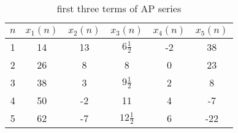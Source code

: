 

\begin{table}[h]
  \centering
  \begin{tabular}{|c|c|c|c|c|c| }
    \hline
    \(n\) & \(x_1(n)\)& \(x_2(n)\) & \(x_3(n)\) & \(x_4(n)\) & \(x_5(n)\) \\
    \hline
    1 & 14 & 13 & $6\frac{1}{2}$ & -2 & 38 \\
    2 & 26 & 8 & 8 & 0 & 23 \\
    3 & 38 & 3 & $9\frac{1}{2}$ & 2 & 8 \\
    4 & 50 & -2 & 11 & 4 & -7 \\
    5 & 62 & -7 & $12\frac{1}{2}$ & 6 & -22 \\
    \hline
  \end{tabular}
  \caption{first three terms of AP series}
  \label{tab:xn}
\end{table}



